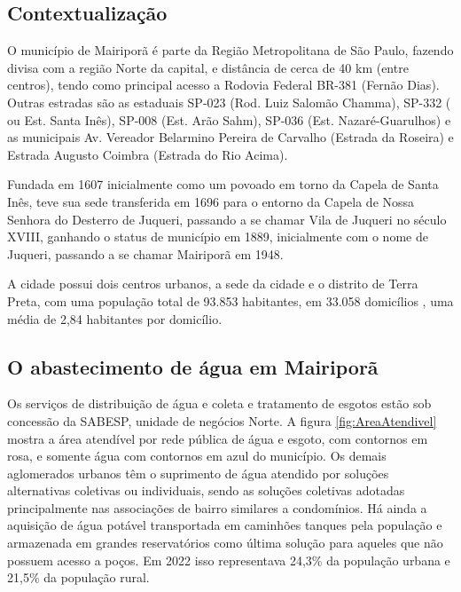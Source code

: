 \subsection{Contextualização}\label{subsec:Contexto}

O município de Mairiporã é parte da Região Metropolitana de São Paulo, fazendo divisa com a região Norte da capital, e distância de cerca de 40 km (entre centros), tendo como principal acesso a Rodovia Federal BR-381 (Fernão Dias). Outras estradas são as estaduais SP-023 (Rod. Luiz Salomão Chamma), SP-332 ( ou Est. Santa Inês), SP-008 (Est. Arão Sahm), SP-036 (Est. Nazaré-Guarulhos) e as municipais Av. Vereador Belarmino Pereira de Carvalho (Estrada da Roseira) e Estrada Augusto Coimbra (Estrada do Rio Acima). \cite{MairiporaEstanciaTuristica}

Fundada em 1607 inicialmente como um povoado em torno da Capela de Santa Inês, teve sua sede transferida em 1696 para o entorno da Capela de Nossa Senhora do Desterro de Juqueri, passando a se chamar Vila de Juqueri no século XVIII, ganhando o status de município em 1889, inicialmente com o nome de Juqueri, passando a se chamar Mairiporã em 1948. \cite{MairiporaEstanciaTuristica}

A cidade possui dois centros urbanos, a sede da cidade e o distrito de Terra Preta, com uma população total de 93.853 habitantes, em 33.058 domicílios \cite{IBGE_Mairipora_2024}, uma média de 2,84 habitantes por domicílio. 




\subsection{O abastecimento de água em Mairiporã}\label{subsec:abastecimentoMairipora}

Os serviços de distribuição de água e coleta e tratamento de esgotos estão sob concessão da SABESP, unidade de negócios Norte. A figura \ref{fig:AreaAtendivel} mostra a área atendível por rede pública de água e esgoto, com contornos em rosa, e somente água com contornos em azul do município. Os demais aglomerados urbanos têm o suprimento de água atendido por soluções alternativas coletivas ou individuais, sendo as soluções coletivas adotadas principalmente nas associações de bairro similares a condomínios. Há ainda a aquisição de água potável transportada em caminhões tanques pela população e armazenada em grandes reservatórios como última solução para aqueles que não possuem acesso a poços. Em 2022 isso representava 24,3\% da população urbana e 21,5\% da população rural. \cite{RelSinteseMairipora2022}



